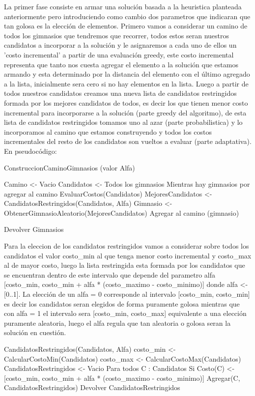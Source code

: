 La primer fase consiste en armar una solución basada a la heuristica planteada anteriormente pero introduciendo como cambio dos parametros que indicaran que tan golosa es la elección de elementos. Primero vamos a considerar un camino de todos los gimnasios que tendremos que recorrer, todos estos seran nuestros candidatos a incorporar a la solución y le asignaremos a cada uno de ellos un 'costo incremental' a partir de una evaluación greedy, este costo incremental representa que tanto nos cuesta agregar el elemento a la solución que estamos armando y esta determinado por la distancia del elemento con el último agregado a la lista, inicialmente sera cero si no hay elementos en la lista. Luego a partir de todos nuestros candidatos creamos una nueva lista de candidatos restringidos formada por los mejores candidatos de todos, es decir los que tienen menor costo incremental para incorporarse a la solución (parte greedy del algoritmo), de esta lista de candidatos restringidos tomamos uno al azar (parte probabilistica) y lo incorporamos al camino que estamos construyendo y todos los costos incrementales del resto de los candidatos son vueltos a evaluar (parte adaptativa). En pseudocódigo:


	ConstruccionCaminoGimnasios (valor Alfa)

	Camino <- Vacio
	Candidatos <- Todos los gimnasios
	Mientras hay gimnasios por agregar al camino
		EvaluarCostos(Candidatos)
		MejoresCandidatos <- CandidatosRestringidos(Candidatos, Alfa)
		Gimnasio <- ObtenerGimnasioAleatorio(MejoresCandidatos)
		Agregar al camino (gimnasio)

	Devolver Gimnasios

Para la eleccion de los candidatos restringidos vamos a considerar sobre todos los candidatos el valor costo_min al que tenga menor costo incremental y costo_max al de mayor costo, luego la lista restringida esta formada por los candidatos que se encuentran dentro de este intervalo que depende del parametro alfa [costo_min, costo_min + alfa * (costo_maximo - costo_minimo)] donde alfa <- [0..1]. La elección de un alfa = 0 corresponde al intervalo [costo_min, costo_min] es decir los candidatos seran elegidos de forma puramente golosa mientras que con alfa = 1 el intervalo sera [costo_min, costo_max] equivalente a una elección puramente aleatoria, luego el alfa regula que tan aleatoria o golosa seran la solución en cuestión.

	CandidatosRestringidos(Candidatos, Alfa)
		costo_min <- CalcularCostoMin(Candidatos)
		costo_max <- CalcularCostoMax(Candidatos)
		CandidatosRestringidos <- Vacio
		Para todos C : Candidatos
			Si Costo(C) <- [costo_min, costo_min + alfa * (costo_maximo - costo_minimo)] Agregar(C, CandidatosRestringidos)
	Devolver CandidatosRestringidos


